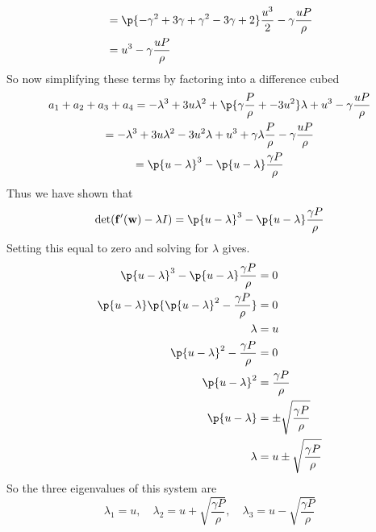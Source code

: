 \documentclass[11pt, oneside]{article}
\begin{document}
\begin{enumerate}
\begin{align*}
      &= \p{-\gamma^2 + 3\gamma + \gamma^2 - 3\gamma + 2} \frac{u^3}{2} - \gamma\frac{uP}{\rho} \\
      &=  u^3 - \gamma\frac{uP}{\rho}
    \end{align*}
    So now simplifying these terms by factoring into a difference cubed
    \begin{gather*}
      a_1 + a_2 + a_3 + a_4 = -\lambda^3 + 3u \lambda^2 + \p{\gamma\frac{P}{\rho} + -3u^2}\lambda + u^3 - \gamma\frac{uP}{\rho} \\
      = -\lambda^3 + 3u \lambda^2 - 3u^2\lambda + u^3 + \gamma\lambda\frac{P}{\rho} - \gamma\frac{uP}{\rho} \\
      = \p{u - \lambda}^3 - \p{u - \lambda} \frac{\gamma P}{\rho} \\
    \end{gather*}
    Thus we have shown that
    \[
      \det(\v{f}'(\v{w}) - \lambda I) = \p{u - \lambda}^3 - \p{u - \lambda} \frac{\gamma P}{\rho}
    \]
    Setting this equal to zero and solving for $\lambda$ gives.
    \begin{align*}
      \p{u - \lambda}^3 - \p{u - \lambda} \frac{\gamma P}{\rho} &= 0 \\
      \p{u - \lambda}\p{\p{u - \lambda}^2 - \frac{\gamma P}{\rho}} &= 0 \\
      \lambda &= u \\
      \p{u - \lambda}^2 - \frac{\gamma P}{\rho} &= 0 \\
      \p{u - \lambda}^2 &= \frac{\gamma P}{\rho} \\
      \p{u - \lambda} &= \pm\sqrt{\frac{\gamma P}{\rho}} \\
      \lambda &= u \pm\sqrt{\frac{\gamma P}{\rho}}
    \end{align*}
    So the three eigenvalues of this system are
    \[
      \lambda_1 = u, \quad \lambda_2 = u + \sqrt{\frac{\gamma P}{\rho}}, \quad \lambda_3 = u - \sqrt{\frac{\gamma P}{\rho}}
    \]


\end{enumerate}
\end{document}
